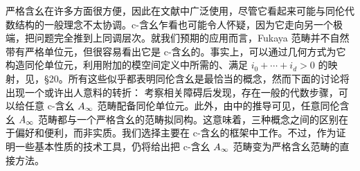 严格含幺在许多方面很方便，因此在文献中广泛使用，尽管它看起来可能与同伦代数结构的一般理念不太协调。c-含幺乍看也可能令人怀疑，因为它走向另一个极端，把问题完全推到上同调层次。就我们预期的应用而言，Fukaya 范畴并不自然带有严格单位元，但很容易看出它是 c-含幺的。事实上，可以通过几何方式为它构造同伦单位元，利用附加的模空间定义中所需的、满足 $i_0+\cdots+i_d>0$ 的映射，见，§20。所有这些似乎都表明同伦含幺是最恰当的概念，然而下面的讨论将出现一个或许出人意料的转折：
考察相关障碍后发现，存在一般的代数步骤，可以给任意 c-含幺 $A_\infty$ 范畴配备同伦单位元。此外，由中的推导可见，任意同伦含幺 $A_\infty$ 范畴都与一个严格含幺的范畴拟同构。这意味着，三种概念之间的区别在于偏好和便利，而非实质。我们选择主要在 c-含幺的框架中工作。不过，作为证明一些基本性质的技术工具，仍将给出把 c-含幺 $A_\infty$ 范畴变为严格含幺范畴的直接方法。

